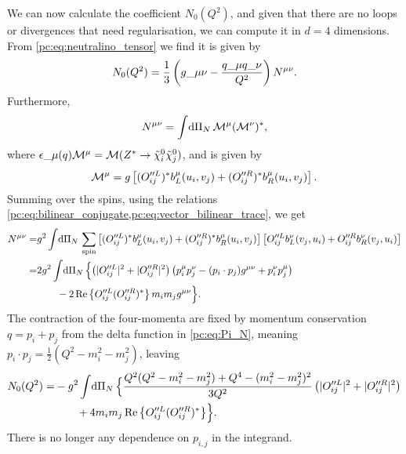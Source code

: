 \documentclass[../main.tex]{subfiles}
\begin{document}
We can now calculate the coefficient \(N_0(Q^2)\), and given that there are no loops or divergences that need regularisation, we can compute it in \(d=4\) dimensions.
From \cref{pc:eq:neutralino_tensor} we find it is given by
\begin{equation}
  N_0(Q^2) = \frac{1}{3} \pclosed{g\_{\mu\nu} - \frac{q\_\mu q\_\nu}{Q^2}} N\^{\mu\nu}.
\end{equation}
Furthermore,
\begin{equation}
  N\^{\mu\nu} = \integral{\Pi_N} \M\^\mu (\M\^\nu)^\ast,
\end{equation}
where \(\epsilon\_\mu(q) \M\^\mu = \M(Z^\ast \to \tilde\chi^0_i \tilde\chi^0_j)\), and is given by
\begin{equation}
  \M\^\mu = g \bclosed{(O_{ij}^{\prime\prime L})^\ast b^\mu_L(u_i, v_j) + (O_{ij}^{\prime\prime R})^\ast b^\mu_R(u_i, v_j)}.
\end{equation}
Summing over the spins, using the relations \cref{pc:eq:bilinear_conjugate,pc:eq:vector_bilinear_trace}, we get
\begin{align}
  \nonumber
  N\^{\mu\nu} = & g^2 \integral{\Pi_N} \sum_\text{spin} \bclosed{(O_{ij}^{\prime\prime L})^\ast b^\mu_L(u_i, v_j) + (O_{ij}^{\prime\prime R})^\ast b^\mu_R(u_i, v_j)} \bclosed{O_{ij}^{\prime\prime L} b^\nu_L(v_j, u_i) + O_{ij}^{\prime\prime R} b^\nu_R(v_j, u_i)} \\
  \nonumber
  =             & 2g^2 \integral{\Pi_N} \Bigl\{\pclosed{|O_{ij}^{\prime\prime L}|^2 + |O_{ij}^{\prime\prime R}|^2} \pclosed{p_i^\mu p_j^\nu - (p_i\cdot p_j)\g + p_i^\nu p_j^\mu}                                                                                     \\
                & \qquad - 2\Re{O_{ij}^{\prime\prime L} (O_{ij}^{\prime\prime R})^\ast} m_i m_j \g \Bigr\}.
\end{align}
The contraction of the four-momenta are fixed by momentum conservation \(q = p_i + p_j\) from the delta function in \cref{pc:eq:Pi_N}, meaning \(p_i \cdot p_j = \frac{1}{2}(Q^2-m_i^2-m_j^2)\), leaving
\begin{align}
  \nonumber
  N_0(Q^2) = & -g^2 \int \!\mathrm{d}\Pi_N\, \Bigl\{\frac{Q^2(Q^2-m_i^2-m_j^2) + Q^4 - (m_i^2-m_j^2)^2}{3Q^2} \left(|O_{ij}^{\prime\prime L}|^2+|O_{ij}^{\prime\prime R}|^2\right) \\
             & \qquad + 4m_i m_j \operatorname{Re}\left\{O_{ij}^{\prime\prime L} (O_{ij}^{\prime\prime R})^\ast\right\} \Bigr\}.
\end{align}
There is no longer any dependence on \(p_{i,j}\) in the integrand.
\end{document}
